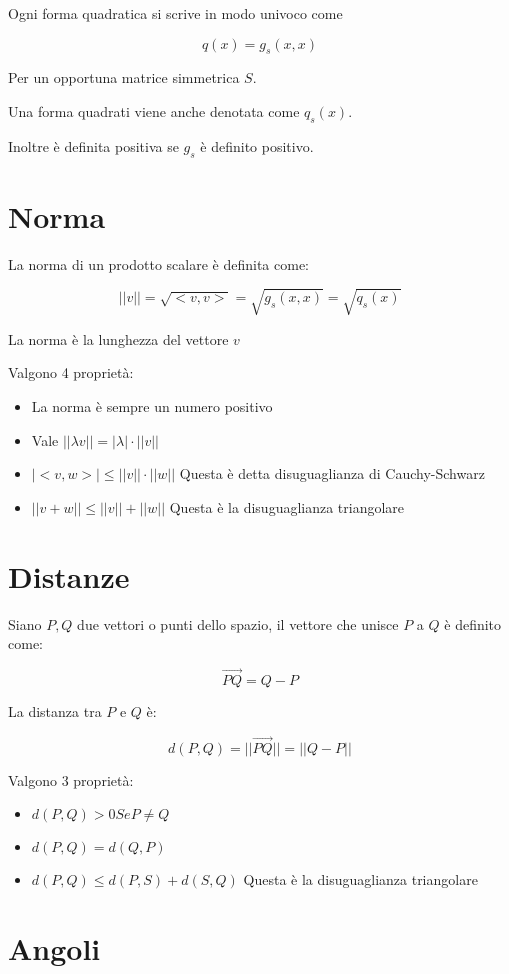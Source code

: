 \documentclass[a4paper, 10pt]{article}
\begin{document}
Ogni forma quadratica si scrive in modo univoco come

$$q(x) = g_s(x,x)$$

Per un opportuna matrice simmetrica $S$.

Una forma quadrati viene anche denotata come $q_s(x)$.

Inoltre è definita positiva se $g_s$ è definito positivo.

\section{Norma}

La norma di un prodotto scalare è definita come:

$$||v|| = \sqrt{<v,v>} = \sqrt{g_s(x,x)} = \sqrt{q_s(x)}$$

La norma è la lunghezza del vettore $v$

Valgono 4 proprietà:

\begin{itemize}
	\item La norma è sempre un numero positivo
	\item Vale $||\lambda v|| = |\lambda| \cdot ||v||$
	\item $|<v,w>| \leq ||v|| \cdot ||w||$ Questa è detta disuguaglianza di Cauchy-Schwarz
	\item $||v+w|| \leq ||v|| + ||w||$ Questa è la disuguaglianza triangolare
\end{itemize}

\section{Distanze}

Siano $P,Q$ due vettori o punti dello spazio, il vettore che unisce $P$ a $Q$ è definito come:

$$\vec{PQ} = Q - P$$

La distanza tra $P$ e $Q$ è:

$$d(P, Q) = ||\vec{PQ}|| = ||Q- P||$$

Valgono 3 proprietà:

\begin{itemize}
	\item $d(P, Q) > 0 Se P \neq Q$
	\item $d(P, Q) = d(Q, P)$
	\item $d(P, Q) \leq d(P,S) + d(S,Q)$ Questa è la disuguaglianza triangolare
\end{itemize}

\section{Angoli}
\end{document}
